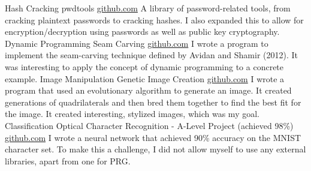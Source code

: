 \documentclass[9pt]{developercv} %
\begin{document}
\begin{entrylist}
    \entry
		{Hash Cracking}
		{pwdtools}
		{\href{https://github.com/JacobInwald/pwdtools}{github.com}}
		{
			A library of password-related tools, from cracking plaintext passwords to cracking hashes. 
		 	I also expanded this to allow for encryption/decryption using passwords as well as public key cryptography.
		 }
    \entry
		{Dynamic Programming}
		{Seam Carving}
		{\href{https://github.com/JacobInwald/Seam-Carving}{github.com}}
		{
			I wrote a program to implement the seam-carving technique defined by Avidan and Shamir (2012). 
		 	It was interesting to apply the concept of dynamic programming to a concrete example.
		}
	\entry
		{Image Manipulation}
		{Genetic Image Creation}
		{\href{https://github.com/JacobInwald/generative-image-making}{github.com}}
		{
			I wrote a program that used an evolutionary algorithm to generate an image. 
			It created generations of quadrilaterals and then bred them together to find the best fit for the image.
			It created interesting, stylized images, which was my goal. 
		}
    \entry
		{Classification}
		{Optical Character Recognition - A-Level Project (achieved 98\%)}
		{\href{https://github.com/JacobInwald/OCRAlgebra}{github.com}}
		{
			I wrote a neural network that achieved 90\% accuracy on the MNIST character set. 
			To make this a challenge, I did not allow myself to use any external libraries, apart from one for PRG.  
		}
\end{entrylist}
\end{document}
